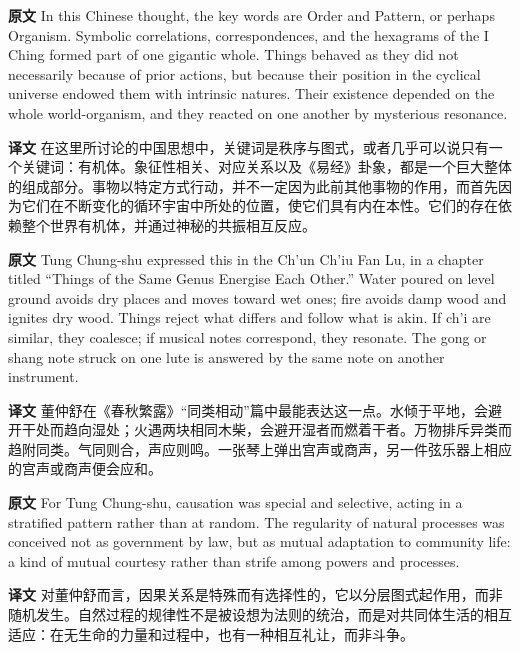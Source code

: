 \documentclass[UTF8,zihao=-4]{ctexart}
\newcommand{\BodyFont}{\fontsize{10.5pt}{15.5pt}\selectfont}
\newcommand{\origlabel}{\textbf{原文}\quad}
\newcommand{\translabel}{\textbf{译文}\quad}
\newenvironment{enblock}{\par\noindent\begingroup\BodyFont\origlabel}{\par\endgroup}
\newenvironment{zhblock}{\par\noindent\begingroup\BodyFont\translabel}{\par\endgroup\vspace{0.35em}}
\begin{document}
\begin{enblock}
In this Chinese thought, the key words are Order and Pattern, or perhaps Organism. Symbolic correlations, correspondences, and the hexagrams of the I Ching formed part of one gigantic whole. Things behaved as they did not necessarily because of prior actions, but because their position in the cyclical universe endowed them with intrinsic natures. Their existence depended on the whole world-organism, and they reacted on one another by mysterious resonance.
\end{enblock}
\begin{zhblock}
在这里所讨论的中国思想中，关键词是秩序与图式，或者几乎可以说只有一个关键词：有机体。象征性相关、对应关系以及《易经》卦象，都是一个巨大整体的组成部分。事物以特定方式行动，并不一定因为此前其他事物的作用，而首先因为它们在不断变化的循环宇宙中所处的位置，使它们具有内在本性。它们的存在依赖整个世界有机体，并通过神秘的共振相互反应。
\end{zhblock}

\begin{enblock}
Tung Chung-shu expressed this in the Ch'un Ch'iu Fan Lu, in a chapter titled ``Things of the Same Genus Energise Each Other.'' Water poured on level ground avoids dry places and moves toward wet ones; fire avoids damp wood and ignites dry wood. Things reject what differs and follow what is akin. If ch'i are similar, they coalesce; if musical notes correspond, they resonate. The gong or shang note struck on one lute is answered by the same note on another instrument.
\end{enblock}
\begin{zhblock}
董仲舒在《春秋繁露》“同类相动”篇中最能表达这一点。水倾于平地，会避开干处而趋向湿处；火遇两块相同木柴，会避开湿者而燃着干者。万物排斥异类而趋附同类。气同则合，声应则鸣。一张琴上弹出宫声或商声，另一件弦乐器上相应的宫声或商声便会应和。
\end{zhblock}

\begin{enblock}
For Tung Chung-shu, causation was special and selective, acting in a stratified pattern rather than at random. The regularity of natural processes was conceived not as government by law, but as mutual adaptation to community life: a kind of mutual courtesy rather than strife among powers and processes.
\end{enblock}
\begin{zhblock}
对董仲舒而言，因果关系是特殊而有选择性的，它以分层图式起作用，而非随机发生。自然过程的规律性不是被设想为法则的统治，而是对共同体生活的相互适应：在无生命的力量和过程中，也有一种相互礼让，而非斗争。
\end{zhblock}
\end{document}
